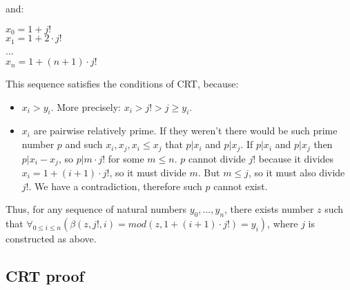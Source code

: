 \documentclass{article}
\begin{document}
and:

\begin{center}
    $x_0 = 1 + j!$\\
    $x_1 = 1 + 2 \cdot j!$\\
    ...\\
    $x_n = 1 + (n + 1) \cdot j!$
\end{center}

This sequence satisfies the conditions of CRT, because:

\begin{itemize}
    \item $x_i > y_i$. More precisely: $x_i > j! > j \geqslant y_i$.
    \item $x_i$ are pairwise relatively prime. If they weren't there would be such prime number $p$
        and such $x_i, x_j, x_i \leq x_j$ that $p | x_i$ and $p | x_j$. If $p | x_i$ and $p | x_j$
        then $p | x_i - x_j$, so $p | m \cdot j!$ for some $m \leqslant n$. $p$ cannot divide $j!$
        because it divides $x_i = 1 + (i+1) \cdot j!$, so it must divide $m$. But $m \leqslant j$,
        so it must also divide $j!$. We have a contradiction, therefore such $p$ cannot exist.
\end{itemize}

Thus, for any sequence of natural numbers $y_0, ..., y_n$, there exists number $z$
such that $\forall_{0 \leqslant i \leqslant n}(\beta(z, j!, i) = mod(z, 1 + (i + 1) \cdot j!) = y_i)$,
where $j$ is constructed as above.

\subsection{CRT proof}



\end{document}
